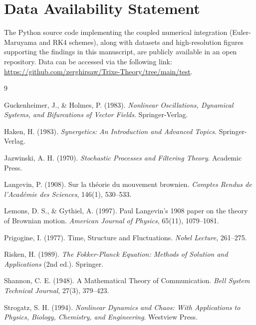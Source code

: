 \documentclass[12pt, a4paper]{article}
\begin{document}
\section*{Data Availability Statement}
The Python source code implementing the coupled numerical integration (Euler-Maruyama and RK4 schemes), along with datasets and high-resolution figures supporting the findings in this manuscript, are publicly available in an open repository. Data can be accessed via the following link: \url{https://github.com/zerghirsaw/Trixe-Theory/tree/main/test}.

\vspace{2em}

\begin{thebibliography}{9}

Guckenheimer, J., \& Holmes, P. (1983). \textit{Nonlinear Oscillations, Dynamical Systems, and Bifurcations of Vector Fields}. Springer-Verlag.

Haken, H. (1983). \textit{Synergetics: An Introduction and Advanced Topics}. Springer-Verlag.

Jazwinski, A. H. (1970). \textit{Stochastic Processes and Filtering Theory}. Academic Press.

Langevin, P. (1908). Sur la théorie du mouvement brownien. \textit{Comptes Rendus de l'Académie des Sciences}, 146(1), 530--533.

Lemons, D. S., \& Gythiel, A. (1997). Paul Langevin’s 1908 paper on the theory of Brownian motion. \textit{American Journal of Physics}, 65(11), 1079--1081.

Prigogine, I. (1977). Time, Structure and Fluctuations. \textit{Nobel Lecture}, 261--275.

Risken, H. (1989). \textit{The Fokker-Planck Equation: Methods of Solution and Applications} (2nd ed.). Springer.

Shannon, C. E. (1948). A Mathematical Theory of Communication. \textit{Bell System Technical Journal}, 27(3), 379--423.

Strogatz, S. H. (1994). \textit{Nonlinear Dynamics and Chaos: With Applications to Physics, Biology, Chemistry, and Engineering}. Westview Press.

\end{thebibliography}
\end{document}
